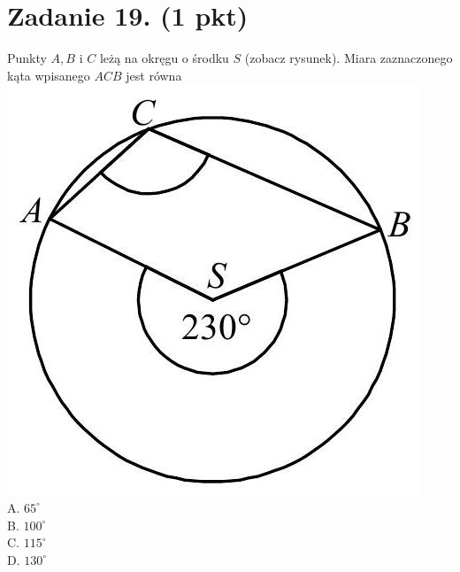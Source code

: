 \documentclass[10pt]{article}
\begin{document}
\section*{Zadanie 19. (1 pkt)}
Punkty \(A, B\) i \(C\) leżą na okręgu o środku \(S\) (zobacz rysunek). Miara zaznaczonego kąta wpisanego \(A C B\) jest równa\\
\includegraphics[max width=\textwidth, center]{2024_11_21_603d5c1b2a7d8d68f45fg-08}\\
A. \(65^{\circ}\)\\
B. \(100^{\circ}\)\\
C. \(115^{\circ}\)\\
D. \(130^{\circ}\)
\end{document}
